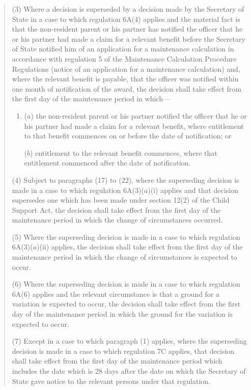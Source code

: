 \documentclass[12pt,a4paper]{article}
\begin{document}
\begin{quotation}
(3) Where a decision is superseded by a decision made by the Secretary of State in a case to which regulation 6A(4) applies and the material fact is that the non-resident parent or his partner has notified the officer that he or his partner had made a claim for a relevant benefit before the Secretary of State notified him of an application for a maintenance calculation in accordance with regulation 5 of the Maintenance Calculation Procedure Regulations (notice of an application for a maintenance calculation) and, where the relevant benefit is payable, that the officer was notified within one month of notification of the award, the decision shall take effect from the first day of the maintenance period in which—
\begin{enumerate}\item[]
($a$) the non-resident parent or his partner notified the officer that he or his partner had made a claim for a relevant benefit, where entitlement to that benefit commences on or before the date of notification; or

($b$) entitlement to the relevant benefit commences, where that entitlement commenced after the date of notification.
\end{enumerate}

(4) Subject to paragraphs (17) to (22), where the superseding decision is made in a case to which regulation 6A(3)($a$)(i)  applies and that decision supersedes one which has been made under section 12(2) of the Child Support Act, the decision shall take effect from the first day of the maintenance period in which the change of circumstances occurred.

(5) Where the superseding decision is made in a case to which regulation 6A(3)($a$)(ii)  applies, the decision shall take effect from the first day of the maintenance period in which the change of circumstances is expected to occur.

(6) Where the superseding decision is made in a case to which regulation 6A(6) applies and the relevant circumstance is that a ground for a variation is expected to occur, the decision shall take effect from the first day of the maintenance period in which the ground for the variation is expected to occur.

(7) Except in a case to which paragraph (1) applies, where the superseding decision is made in a case to which regulation 7C applies, that decision shall take effect from the first day of the maintenance period which includes the date which is 28 days after the date on which the Secretary of State gave notice to the relevant persons under that regulation.


\end{quotation}
\end{document}
